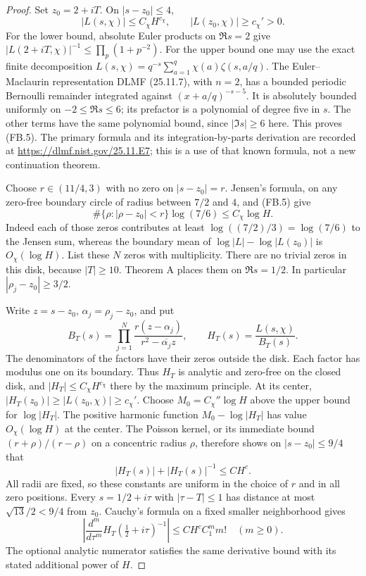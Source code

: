 \begin{proof}
Set $z_0=2+iT$.  On $|s-z_0|\leq4$,
\[
          |L(s,\chi)|\leq C_\chi H^{c_\chi},
                   \qquad |L(z_0,\chi)|\geq c_\chi'>0.
                                                               \tag{FB.5}
\]
For the lower bound, absolute Euler products on $\Re s=2$
give $|L(2+iT,\chi)|^{-1}\leq\prod_p(1+p^{-2})$.
For the upper bound one may use the exact finite decomposition
$L(s,\chi)=q^{-s}\sum_{a=1}^q\chi(a)\zeta(s,a/q)$.
The Euler--Maclaurin representation DLMF (25.11.7),
with $n=2$, has a bounded periodic Bernoulli remainder
integrated against $(x+a/q)^{-s-5}$.
It is absolutely bounded uniformly on $-2\leq\Re s\leq6$;
its prefactor is a polynomial of degree five in $s$.
The other terms have the same polynomial bound, since
$|\Im s|\geq6$ here.  This proves (FB.5).
The primary formula and its integration-by-parts derivation
are recorded at
\url{https://dlmf.nist.gov/25.11.E7};
this is a use of that known formula, not a new continuation
theorem.

Choose $r\in(11/4,3)$ with no zero on $|s-z_0|=r$.
Jensen's formula, on any zero-free boundary circle of radius
between $7/2$ and $4$, and (FB.5) give
\[
 \#\{\rho:|\rho-z_0|<r\}\log(7/6)\leq C_\chi\log H.
                                                               \tag{FB.6}
\]
Indeed each of those zeros contributes at least
$\log((7/2)/3)=\log(7/6)$ to the Jensen sum, whereas
the boundary mean of $\log|L|-\log|L(z_0)|$ is
$O_\chi(\log H)$.
List these $N$ zeros with multiplicity.
There are no trivial zeros in this disk, because $|T|\geq10$.
Theorem A places them on $\Re s=1/2$.
In particular $|\rho_j-z_0|\geq3/2$.

Write $z=s-z_0$, $\alpha_j=\rho_j-z_0$, and put
\[
 B_T(s)=\prod_{j=1}^N
       \frac{r(z-\alpha_j)}{r^2-\overline{\alpha_j}z},
                    \qquad H_T(s)=\frac{L(s,\chi)}{B_T(s)}.
                                                               \tag{FB.7}
\]
The denominators of the factors have their zeros outside
the disk.  Each factor has modulus one on its boundary.
Thus $H_T$ is analytic and zero-free on the closed disk,
and $|H_T|\leq C_\chi H^{c_\chi}$ there by the maximum
principle.  At its center,
$|H_T(z_0)|\geq|L(z_0,\chi)|\geq c_\chi'$.
Choose $M_0=C_\chi''\log H$ above the upper bound for
$\log|H_T|$.  The positive harmonic function
$M_0-\log|H_T|$ has value $O_\chi(\log H)$ at the center.
The Poisson kernel, or its immediate bound
$(r+\rho)/(r-\rho)$ on a concentric radius $\rho$,
therefore shows on $|s-z_0|\leq9/4$ that
\[
                   |H_T(s)|+|H_T(s)|^{-1}\leq C H^c.
                                                               \tag{FB.8}
\]
All radii are fixed, so these constants are uniform in the
choice of $r$ and in all zero positions.
Every $s=1/2+i\tau$ with $|\tau-T|\leq1$ has distance
at most $\sqrt{13}/2<9/4$ from $z_0$.
Cauchy's formula on a fixed smaller neighborhood gives
\[
 \left|\frac{d^m}{d\tau^m}
                H_T(\tfrac12+i\tau)^{-1}\right|
                     \leq C H^c C_1^m m!\quad(m\geq0).
                                                               \tag{FB.9}
\]
The optional analytic numerator satisfies the same
derivative bound with its stated additional power of $H$.


\end{proof}

